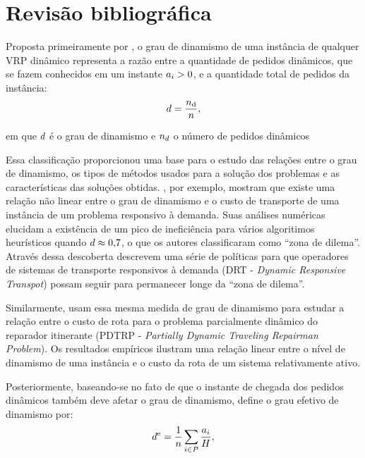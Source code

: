 \section{Revisão bibliográfica}\label{sec:medidas_revisao}

Proposta primeiramente por , o grau de dinamismo
de uma instância de qualquer VRP dinâmico representa a razão entre a quantidade
de pedidos dinâmicos, que se fazem conhecidos em um instante
$a_i > 0$, e a quantidade total de pedidos da instância:
%
\begin{equation}
  d = \frac{n_{\text{d}}}{n},
  \label{eq:degreeOfDynamism}
\end{equation}

\noindent em que $d$ é o grau de dinamismo e 
$n_{d}$ o número de pedidos dinâmicos

Essa classificação proporcionou uma base para o estudo das relações entre o 
grau de dinamismo, os tipos de métodos usados para a solução dos 
problemas e as características das soluções obtidas.
, por exemplo, mostram que existe uma relação não
linear entre o grau de dinamismo e o custo de transporte de uma instância de um
problema responsivo à demanda.
Suas análises numéricas elucidam a existência de um pico de ineficiência para
vários algoritimos heurísticos quando $d \approx 0{,}7$, o que
os autores classificaram como ``zona de dilema''.
Através dessa descoberta  descrevem uma série de
políticas para que operadores de sistemas de transporte responsivos à demanda
(DRT - \textit{Dynamic Responsive Transpot}) possam seguir para permanecer 
longe da ``zona de dilema''.

Similarmente,  usam essa mesma medida de 
grau de dinamismo para estudar a relação entre o custo de rota para o 
problema parcialmente dinâmico do reparador itinerante 
(PDTRP - \textit{Partially Dynamic Traveling Repairman Problem}).
Os resultados empíricos ilustram uma relação linear entre o nível de
dinamismo de uma instância e o custo da rota de um sistema relativamente ativo.

Posteriormente, baseando-se no fato de que o instante de chegada dos pedidos
dinâmicos também deve afetar o grau de dinamismo,
\textcite{larsen_dynamic_2000} define o grau efetivo de dinamismo por:
%
\begin{equation}
  d^\text{e} = 
  \frac{1}{n}
  \sum_{i \in P}
  {
    \frac{a_i}{H}
  },
  \label{eq:eDegreeOfDynamism}
\end{equation}

